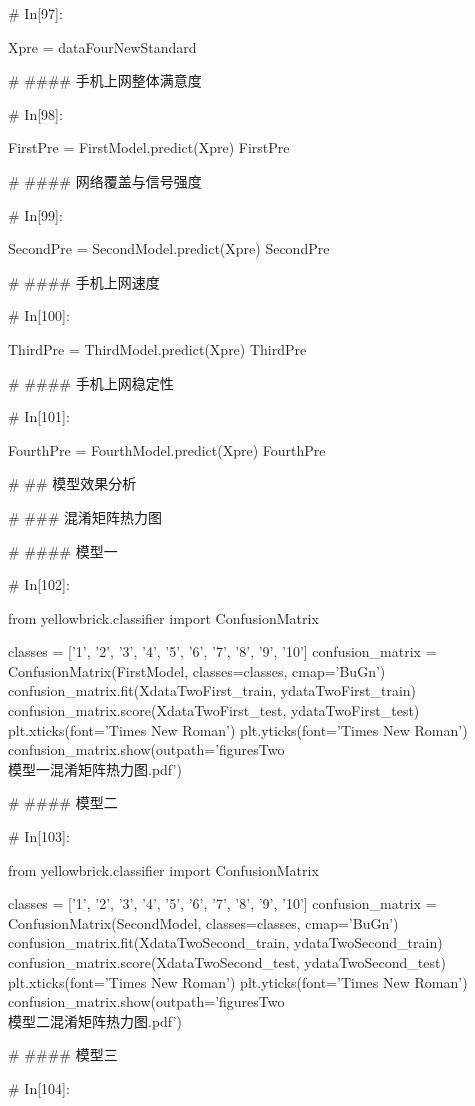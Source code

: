 \documentclass{MathorCupmodeling}
\begin{document}
\begin{python}
	# In[97]:
	
	
	Xpre = dataFourNewStandard
	
	# #### 手机上网整体满意度
	
	# In[98]:
	
	
	FirstPre = FirstModel.predict(Xpre)
	FirstPre
	
	# #### 网络覆盖与信号强度
	
	# In[99]:
	
	
	SecondPre = SecondModel.predict(Xpre)
	SecondPre
	
	# #### 手机上网速度
	
	# In[100]:
	
	
	ThirdPre = ThirdModel.predict(Xpre)
	ThirdPre
	
	# #### 手机上网稳定性
	
	# In[101]:
	
	
	FourthPre = FourthModel.predict(Xpre)
	FourthPre
	
	# ## 模型效果分析
	
	# ### 混淆矩阵热力图
	
	# #### 模型一
	
	# In[102]:
	
	
	from yellowbrick.classifier import ConfusionMatrix
	
	classes = ['1', '2', '3', '4', '5', '6', '7', '8', '9', '10']
	confusion_matrix = ConfusionMatrix(FirstModel, classes=classes, cmap='BuGn')
	confusion_matrix.fit(XdataTwoFirst_train, ydataTwoFirst_train)
	confusion_matrix.score(XdataTwoFirst_test, ydataTwoFirst_test)
	plt.xticks(font='Times New Roman')
	plt.yticks(font='Times New Roman')
	confusion_matrix.show(outpath='figuresTwo\\[附件2]模型一混淆矩阵热力图.pdf')
	
	# #### 模型二
	
	# In[103]:
	
	
	from yellowbrick.classifier import ConfusionMatrix
	
	classes = ['1', '2', '3', '4', '5', '6', '7', '8', '9', '10']
	confusion_matrix = ConfusionMatrix(SecondModel, classes=classes, cmap='BuGn')
	confusion_matrix.fit(XdataTwoSecond_train, ydataTwoSecond_train)
	confusion_matrix.score(XdataTwoSecond_test, ydataTwoSecond_test)
	plt.xticks(font='Times New Roman')
	plt.yticks(font='Times New Roman')
	confusion_matrix.show(outpath='figuresTwo\\[附件2]模型二混淆矩阵热力图.pdf')
	
	# #### 模型三
	
	# In[104]:
	

\end{python}
\end{document}
